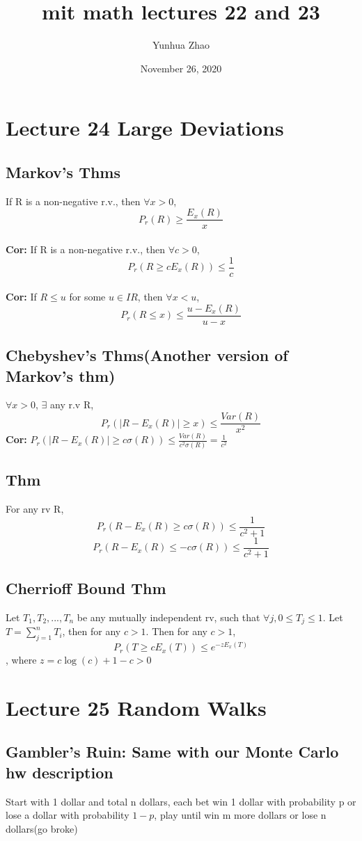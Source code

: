 \documentclass{article}
\title{mit math lectures 22 and 23}
\author{Yunhua Zhao}
\date{November 26, 2020}
\begin{document}
\maketitle

\section{Lecture 24 Large Deviations} 
\subsection{Markov's Thms}
If R is a non-negative r.v., then $\forall x>0$, $$P_r(R)\geq \frac{E_x(R)}{x}$$ \\
\textbf{Cor:} If R is a non-negative r.v., then $\forall c>0$, $$P_r(R\geq cE_x(R))\leq \frac{1}{c}$$ \\
\textbf{Cor:} If $R\leq u$ for some $u\in IR$, then $\forall x<u$, $$P_r(R\leq x)\leq\frac{u-E_x(R)}{u-x}$$
\subsection{Chebyshev's Thms(Another version of Markov's thm)} 
$\forall x>0$, $\exists$ any r.v R, $$P_r(|R-E_x(R)|\geq x)\leq\frac{Var(R)}{x^2}$$
\textbf{Cor:} $P_r(|R-E_x(R)|\geq c\sigma(R))\leq\frac{Var(R)}{c^2\sigma(R)} = \frac{1}{c^2}$ \\
\subsection{Thm}
For any rv R, 
$$ P_r(R-E_x(R)\geq c\sigma(R))\leq\frac{1}{c^2+1} $$
$$ P_r(R-E_x(R)\leq -c\sigma(R))\leq\frac{1}{c^2+1} $$
\subsection{Cherrioff Bound Thm}
Let $T_1,T_2,...,T_n$ be any mutually independent rv, such that $\forall j, 0\leq T_j \leq 1$. Let $T=\sum_{j=1}^{n}T_i$, then for any $c>1$. Then for any $c>1$, $$P_r(T\geq cE_x(T))\leq e^{-zE_x(T)}$$, where $z=c\log(c)+1-c>0$ \\
\section{Lecture 25 Random Walks}
\subsection{Gambler's Ruin: Same with our Monte Carlo hw description}
Start with 1 dollar and total n dollars, each bet win 1 dollar with probability p or lose a dollar with probability $1-p$, play until win m more dollars or lose n dollars(go broke)  \\
\end{document}
